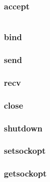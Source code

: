 \subsubsection{accept}

\begin{lstlisting}[language=C]

\end{lstlisting}


\subsubsection{bind}
\subsubsection{send}
\subsubsection{recv}
\subsubsection{close}
\subsubsection{shutdown}
\subsubsection{setsockopt}
\subsubsection{getsockopt}

